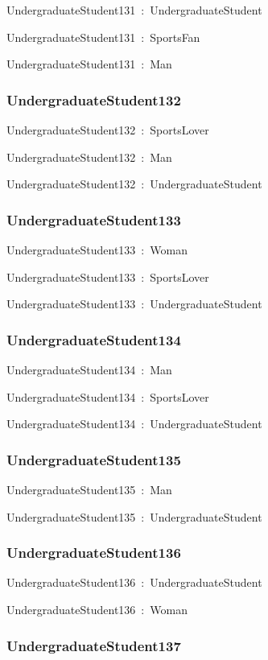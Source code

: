 \documentclass{article}
\begin{document}
UndergraduateStudent131~:~UndergraduateStudent

UndergraduateStudent131~:~SportsFan

UndergraduateStudent131~:~Man

\subsubsection*{UndergraduateStudent132}

UndergraduateStudent132~:~SportsLover

UndergraduateStudent132~:~Man

UndergraduateStudent132~:~UndergraduateStudent

\subsubsection*{UndergraduateStudent133}

UndergraduateStudent133~:~Woman

UndergraduateStudent133~:~SportsLover

UndergraduateStudent133~:~UndergraduateStudent

\subsubsection*{UndergraduateStudent134}

UndergraduateStudent134~:~Man

UndergraduateStudent134~:~SportsLover

UndergraduateStudent134~:~UndergraduateStudent

\subsubsection*{UndergraduateStudent135}

UndergraduateStudent135~:~Man

UndergraduateStudent135~:~UndergraduateStudent

\subsubsection*{UndergraduateStudent136}

UndergraduateStudent136~:~UndergraduateStudent

UndergraduateStudent136~:~Woman

\subsubsection*{UndergraduateStudent137}
\end{document}
